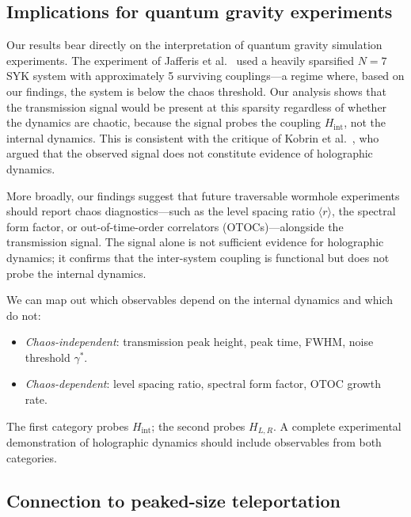 \documentclass[aps,prd,twocolumn,superscriptaddress,nofootinbib,floatfix]{revtex4-2}
\newcommand{\avg}[1]{\langle #1 \rangle}
\begin{document}
\subsection{Implications for quantum gravity experiments}
\label{sec:experiments}

Our results bear directly on the interpretation of quantum gravity
simulation experiments. The experiment of Jafferis et
al.~\cite{Jafferis:2022uhu} used a heavily sparsified $N=7$ SYK system
with approximately 5 surviving couplings---a regime where, based on our
findings, the system is below the chaos threshold. Our analysis shows that
the transmission signal would be present at this sparsity regardless of
whether the dynamics are chaotic, because the signal probes the coupling
$H_\mathrm{int}$, not the internal dynamics. This is consistent with the
critique of Kobrin et al.~\cite{Kobrin:2023cva}, who argued that the
observed signal does not constitute evidence of holographic dynamics.

More broadly, our findings suggest that future traversable wormhole
experiments should report chaos diagnostics---such as the level spacing
ratio $\avg{r}$, the spectral form factor, or out-of-time-order
correlators (OTOCs)---alongside the transmission signal. The signal alone is
not sufficient evidence for holographic dynamics; it confirms that the
inter-system coupling is functional but does not probe the internal
dynamics.

We can map out which observables depend on the internal dynamics and
which do not:
\begin{itemize}
  \item \textit{Chaos-independent}: transmission peak height, peak time,
    FWHM, noise threshold $\gamma^*$.
  \item \textit{Chaos-dependent}: level spacing ratio, spectral form
    factor, OTOC growth rate.
\end{itemize}
The first category probes $H_\mathrm{int}$; the second probes $H_{L,R}$.
A complete experimental demonstration of holographic dynamics should
include observables from both categories.

\subsection{Connection to peaked-size teleportation}
\label{sec:teleportation}
\end{document}
